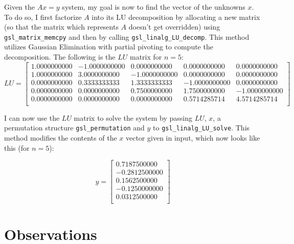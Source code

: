 \documentclass{article}
\newcommand{\code}{\texttt}
\begin{document}
Given the $Ax=y$ system, my goal is now to find the vector of the unknowns $x$. To do so, I first factorize $A$ into its LU decomposition by allocating a new matrix (so that the matrix which represents $A$ doesn't get overridden) using \code{gsl\_matrix\_memcpy} and then by calling \code{gsl\_linalg\_LU\_decomp}. This method utilizes Gaussian Elimination with partial pivoting to compute the decomposition. The following is the $LU$ matrix for $n=5$:
$$
LU=
\begin{bmatrix} 
1.0000000000 & -1.0000000000 & 0.0000000000 & 0.0000000000 & 0.0000000000\\ 
1.0000000000 & 3.0000000000 & -1.0000000000 & 0.0000000000 & 0.0000000000\\ 
0.0000000000 & 0.3333333333 & 1.3333333333 & -1.0000000000 & 0.0000000000\\ 
0.0000000000 & 0.0000000000 & 0.7500000000 & 1.7500000000 & -1.0000000000\\ 
0.0000000000 & 0.0000000000 & 0.0000000000 & 0.5714285714 & 4.5714285714\\
\end{bmatrix}
$$

I can now use the $LU$ matrix to solve the system by passing $LU$, $x$, a permutation structure \code{gsl\_permutation} and $y$ to \code{gsl\_linalg\_LU\_solve}. This method modifies the contents of the $x$ vector given in input, which now looks like this (for $n=5$):

$$
y=
\begin{bmatrix}
0.7187500000\\
-0.2812500000\\
0.1562500000\\
-0.1250000000\\
0.0312500000\\
\end{bmatrix}
$$

\section{Observations}
\end{document}
